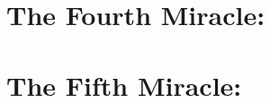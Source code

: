 \documentclass[11pt]{book} %
\begin{document}
\chapter{The Fourth Miracle: }


\chapter{The Fifth Miracle: }

\end{document}
